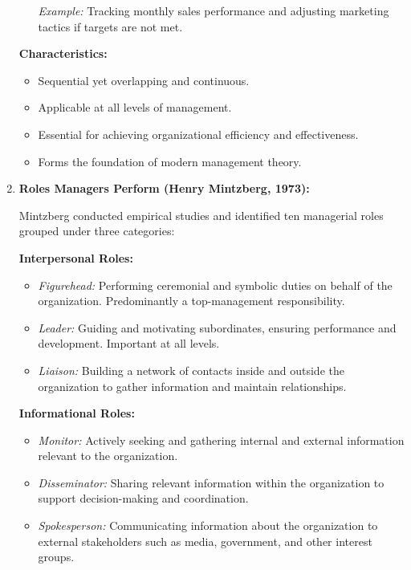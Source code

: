 \documentclass[10pt,a4paper]{book}
\begin{document}
\begin{multicols}{2}
\begin{enumerate}
\begin{itemize}
        \textit{Example:} Tracking monthly sales performance and adjusting marketing tactics if targets are not met.
    \end{itemize}

    \textbf{Characteristics:}
    \begin{itemize}
        \item Sequential yet overlapping and continuous.
        \item Applicable at all levels of management.
        \item Essential for achieving organizational efficiency and effectiveness.
        \item Forms the foundation of modern management theory.
    \end{itemize}

    \item \textbf{Roles Managers Perform (Henry Mintzberg, 1973):}

    Mintzberg conducted empirical studies and identified ten managerial roles grouped under three categories:

    \textbf{Interpersonal Roles:}
    \begin{itemize}
        \item \textit{Figurehead:} Performing ceremonial and symbolic duties on behalf of the organization. Predominantly a top-management responsibility.
        \item \textit{Leader:} Guiding and motivating subordinates, ensuring performance and development. Important at all levels.
        \item \textit{Liaison:} Building a network of contacts inside and outside the organization to gather information and maintain relationships.
    \end{itemize}

    \textbf{Informational Roles:}
    \begin{itemize}
        \item \textit{Monitor:} Actively seeking and gathering internal and external information relevant to the organization.
        \item \textit{Disseminator:} Sharing relevant information within the organization to support decision-making and coordination.
        \item \textit{Spokesperson:} Communicating information about the organization to external stakeholders such as media, government, and other interest groups.
    \end{itemize}


\end{enumerate}
\end{multicols}
\end{document}

